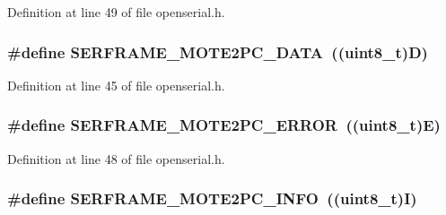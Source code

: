 Definition at line 49 of file openserial.\+h.

\subsubsection[{\texorpdfstring{S\+E\+R\+F\+R\+A\+M\+E\+\_\+\+M\+O\+T\+E2\+P\+C\+\_\+\+D\+A\+TA}{SERFRAME_MOTE2PC_DATA}}]{\setlength{\rightskip}{0pt plus 5cm}\#define S\+E\+R\+F\+R\+A\+M\+E\+\_\+\+M\+O\+T\+E2\+P\+C\+\_\+\+D\+A\+TA~(({\bf uint8\+\_\+t})\textquotesingle{}D\textquotesingle{})}\hypertarget{group___open_serial_ga05f31978f76635b7d03976fc5efb1c58}{}\label{group___open_serial_ga05f31978f76635b7d03976fc5efb1c58}


Definition at line 45 of file openserial.\+h.

\subsubsection[{\texorpdfstring{S\+E\+R\+F\+R\+A\+M\+E\+\_\+\+M\+O\+T\+E2\+P\+C\+\_\+\+E\+R\+R\+OR}{SERFRAME_MOTE2PC_ERROR}}]{\setlength{\rightskip}{0pt plus 5cm}\#define S\+E\+R\+F\+R\+A\+M\+E\+\_\+\+M\+O\+T\+E2\+P\+C\+\_\+\+E\+R\+R\+OR~(({\bf uint8\+\_\+t})\textquotesingle{}E\textquotesingle{})}\hypertarget{group___open_serial_gac4754d961b84d7f03fc34909b9e692ed}{}\label{group___open_serial_gac4754d961b84d7f03fc34909b9e692ed}


Definition at line 48 of file openserial.\+h.

\subsubsection[{\texorpdfstring{S\+E\+R\+F\+R\+A\+M\+E\+\_\+\+M\+O\+T\+E2\+P\+C\+\_\+\+I\+N\+FO}{SERFRAME_MOTE2PC_INFO}}]{\setlength{\rightskip}{0pt plus 5cm}\#define S\+E\+R\+F\+R\+A\+M\+E\+\_\+\+M\+O\+T\+E2\+P\+C\+\_\+\+I\+N\+FO~(({\bf uint8\+\_\+t})\textquotesingle{}I\textquotesingle{})}\hypertarget{group___open_serial_gac3d784a689f2ca9645b40d2c960bba2d}{}\label{group___open_serial_gac3d784a689f2ca9645b40d2c960bba2d}


